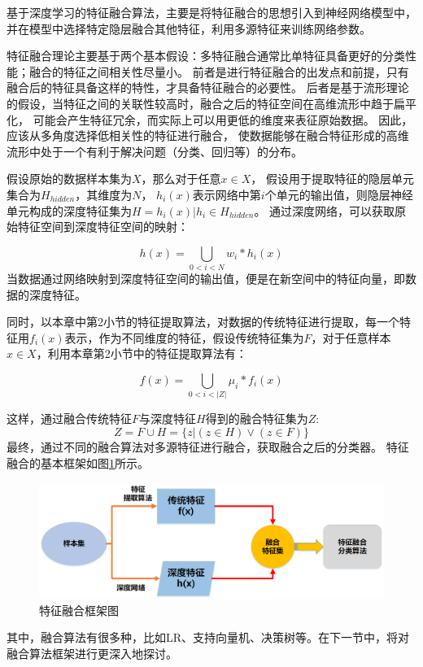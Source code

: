 基于深度学习的特征融合算法，主要是将特征融合的思想引入到神经网络模型中，
并在模型中选择特定隐层融合其他特征，利用多源特征来训练网络参数。\par

特征融合理论主要基于两个基本假设：多特征融合通常比单特征具备更好的分类性能；融合的特征之间相关性尽量小。
前者是进行特征融合的出发点和前提，只有融合后的特征具备这样的特性，才具备特征融合的必要性。
后者是基于流形理论的假设，当特征之间的关联性较高时，融合之后的特征空间在高维流形中趋于扁平化，
可能会产生特征冗余，而实际上可以用更低的维度来表征原始数据。
因此，应该从多角度选择低相关性的特征进行融合，
使数据能够在融合特征形成的高维流形中处于一个有利于解决问题（分类、回归等）的分布。\par

假设原始的数据样本集为$X$，那么对于任意${x \in X}$，
假设用于提取特征的隐层单元集合为$H_{hidden}$，其维度为$N$，
$h_i(x)$表示网络中第$i$个单元的输出值，则隐层神经单元构成的深度特征集为$H={h_i(x)|h_i \in H_{hidden}}$。
通过深度网络，可以获取原始特征空间到深度特征空间的映射：\par
\begin{equation}
	\label{eqt_4_15}
	h(x) = \bigcup_{0<i<N} w_i * h_{i}(x)
\end{equation}
当数据通过网络映射到深度特征空间的输出值，便是在新空间中的特征向量，即数据的深度特征。\par

同时，以本章中第2小节的特征提取算法，对数据的传统特征进行提取，每一个特征用$f_{i}(x)$表示，作为不同维度的特征，假设传统特征集为$F$，对于任意样本$x \in X$，利用本章第2小节中的特征提取算法有：\par
\begin{equation}
	\label{eqt_4_16}
	f(x) = \bigcup_{0<i<|Z|}\mu_{i} * f_{i}(x)
\end{equation}

这样，通过融合传统特征$F$与深度特征$H$得到的融合特征集为$Z$:
\begin{equation}
\label{eqt_4_17}
	Z =F \cup H = \{ z | (z \in H) \vee (z \in F) \}
\end{equation}
最终，通过不同的融合算法对多源特征进行融合，获取融合之后的分类器。
特征融合的基本框架如图\ref{sec:fig_4_1}所示。
\begin{figure}[!h]
	\centering
	\includegraphics[scale=0.5]{figures/chapter_4/fig_4_1.png}
	\caption{特征融合框架图}\label{sec:fig_4_1}
\end{figure}
其中，融合算法有很多种，比如LR、支持向量机、决策树等。在下一节中，将对融合算法框架进行更深入地探讨。



